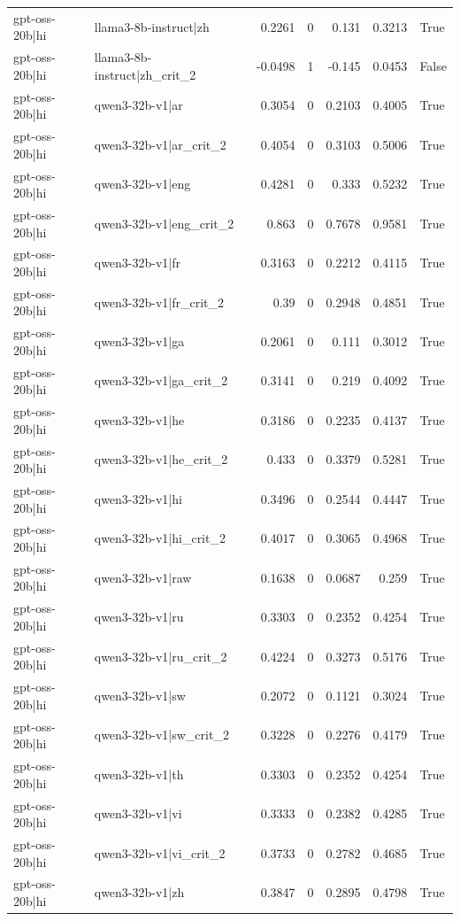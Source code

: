 \begin{table}
\begin{tabular}{l l r r r r l}
gpt-oss-20b|hi & llama3-8b-instruct|zh & 0.2261 & 0 & 0.131 & 0.3213 & True \\
gpt-oss-20b|hi & llama3-8b-instruct|zh_crit_2 & -0.0498 & 1 & -0.145 & 0.0453 & False \\
gpt-oss-20b|hi & qwen3-32b-v1|ar & 0.3054 & 0 & 0.2103 & 0.4005 & True \\
gpt-oss-20b|hi & qwen3-32b-v1|ar_crit_2 & 0.4054 & 0 & 0.3103 & 0.5006 & True \\
gpt-oss-20b|hi & qwen3-32b-v1|eng & 0.4281 & 0 & 0.333 & 0.5232 & True \\
gpt-oss-20b|hi & qwen3-32b-v1|eng_crit_2 & 0.863 & 0 & 0.7678 & 0.9581 & True \\
gpt-oss-20b|hi & qwen3-32b-v1|fr & 0.3163 & 0 & 0.2212 & 0.4115 & True \\
gpt-oss-20b|hi & qwen3-32b-v1|fr_crit_2 & 0.39 & 0 & 0.2948 & 0.4851 & True \\
gpt-oss-20b|hi & qwen3-32b-v1|ga & 0.2061 & 0 & 0.111 & 0.3012 & True \\
gpt-oss-20b|hi & qwen3-32b-v1|ga_crit_2 & 0.3141 & 0 & 0.219 & 0.4092 & True \\
gpt-oss-20b|hi & qwen3-32b-v1|he & 0.3186 & 0 & 0.2235 & 0.4137 & True \\
gpt-oss-20b|hi & qwen3-32b-v1|he_crit_2 & 0.433 & 0 & 0.3379 & 0.5281 & True \\
gpt-oss-20b|hi & qwen3-32b-v1|hi & 0.3496 & 0 & 0.2544 & 0.4447 & True \\
gpt-oss-20b|hi & qwen3-32b-v1|hi_crit_2 & 0.4017 & 0 & 0.3065 & 0.4968 & True \\
gpt-oss-20b|hi & qwen3-32b-v1|raw & 0.1638 & 0 & 0.0687 & 0.259 & True \\
gpt-oss-20b|hi & qwen3-32b-v1|ru & 0.3303 & 0 & 0.2352 & 0.4254 & True \\
gpt-oss-20b|hi & qwen3-32b-v1|ru_crit_2 & 0.4224 & 0 & 0.3273 & 0.5176 & True \\
gpt-oss-20b|hi & qwen3-32b-v1|sw & 0.2072 & 0 & 0.1121 & 0.3024 & True \\
gpt-oss-20b|hi & qwen3-32b-v1|sw_crit_2 & 0.3228 & 0 & 0.2276 & 0.4179 & True \\
gpt-oss-20b|hi & qwen3-32b-v1|th & 0.3303 & 0 & 0.2352 & 0.4254 & True \\
gpt-oss-20b|hi & qwen3-32b-v1|vi & 0.3333 & 0 & 0.2382 & 0.4285 & True \\
gpt-oss-20b|hi & qwen3-32b-v1|vi_crit_2 & 0.3733 & 0 & 0.2782 & 0.4685 & True \\
gpt-oss-20b|hi & qwen3-32b-v1|zh & 0.3847 & 0 & 0.2895 & 0.4798 & True \\

\end{tabular}
\end{table}
